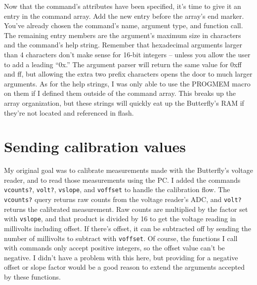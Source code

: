 Now that the command's attributes have been specified, it's time to give it an entry in the command array.  Add the new entry before the array's end marker.  You've already chosen the command's name, argument type, and function call.  The remaining entry members are the argument's maximum size in characters and the command's help string.  Remember that hexadecimal arguments larger than 4 characters don't make sense for 16-bit integers -- unless you allow the user to add a leading ``0x.''  The argument parser will return the same value for 0xff and ff, but allowing the extra two prefix characters opens the door to much larger arguments.  As for the help strings, I was only able to use the PROGMEM macro on them if I defined them outside of the command array.  This breaks up the array organization, but these strings will quickly eat up the Butterfly's RAM if they're not located and referenced in flash.  

\section{Sending calibration values}
My original goal was to calibrate measurements made with the Butterfly's voltage reader, and to read those measurements using the PC.  I added the commands \texttt{vcounts?}, \texttt{volt?}, \texttt{vslope}, and \texttt{voffset} to handle the calibration flow.  The \texttt{vcounts?} query returns raw counts from the voltage reader's ADC, and \texttt{volt?} returns the calibrated measurement.  Raw counts are multiplied by the factor set with \texttt{vslope}, and that product is divided by 16 to get the voltage reading in millivolts including offset.  If there's offset, it can be subtracted off by sending the number of millivolts to subtract with \texttt{voffset}.  Of course, the functions I call with commands only accept positive integers, so the offset value can't be negative.  I didn't have a problem with this here, but providing for a negative offset or slope factor would be a good reason to extend the arguments accepted by these functions.

